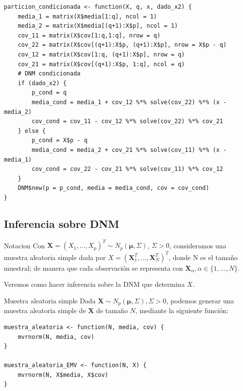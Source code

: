 \documentclass[xcolor=table]{beamer}
\begin{document}
\begin{frame}[fragile]
\scriptsize
\begin{lstlisting}
particion_condicionada <- function(X, q, x, dado_x2) {
    media_1 = matrix(X$media[1:q], ncol = 1)
    media_2 = matrix(X$media[(q+1):X$p], ncol = 1)
    cov_11 = matrix(X$cov[1:q,1:q], nrow = q)
    cov_22 = matrix(X$cov[(q+1):X$p, (q+1):X$p], nrow = X$p - q)
    cov_12 = matrix(X$cov[1:q, (q+1):X$p], nrow = q)
    cov_21 = matrix(X$cov[(q+1):X$p, 1:q], ncol = q)
    # DNM condicionada
    if (dado_x2) {
        p_cond = q
        media_cond = media_1 + cov_12 %*% solve(cov_22) %*% (x - media_2)
        cov_cond = cov_11 - cov_12 %*% solve(cov_22) %*% cov_21
    } else {
        p_cond = X$p - q
        media_cond = media_2 + cov_21 %*% solve(cov_11) %*% (x - media_1)
        cov_cond = cov_22 - cov_21 %*% solve(cov_11) %*% cov_12
    }
    DNM$new(p = p_cond, media = media_cond, cov = cov_cond)
}
\end{lstlisting}
\end{frame}

\subsection{Inferencia sobre DNM}

\begin{frame}[fragile]{Notacion}
Con $\pmb{X} = (X_1, \ldots, X_p)^T \sim N_p(\pmb{\mu}, \Sigma)$, $\Sigma > 0$, consideramos una muestra aleatoria simple dada por $X = (\pmb{X}_1^T, \ldots, \pmb{X}_N^T)^T$, donde N es el tamaño muestral; de manera que cada observación se representa con $\pmb{X}_\alpha, \alpha \in \{1, \ldots, N\}$.

Veremos como hacer inferencia sobre la DNM que determina $X$.
\end{frame}


\begin{frame}[fragile]{Muestra aleatoria simple}
Dada $\pmb{X} \sim N_p(\pmb{\mu}, \Sigma), \Sigma > 0$, podemos generar una muestra aleatoria simple de $\pmb{X}$ de tamaño $N$, mediante la siguiente función:

\begin{lstlisting}
muestra_aleatoria <- function(N, media, cov) {
    mvrnorm(N, media, cov)
}

muestra_aleatoria_EMV <- function(N, X) {
    mvrnorm(N, X$media, X$cov)
}
\end{lstlisting}

\end{frame}
\end{document}
